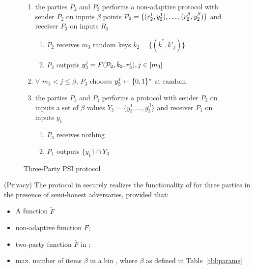 \begin{figure}[h]
{\begin{minipage}{0.95\linewidth}
\begin{enumerate}
				\item the parties $P_2$ and $P_3$ performs a non-adaptive \OPPRF protocol with sender $P_2$ on inputs $\beta$ points $\P_2=\{ (r^1_2, y^1_2), \ldots, (r^{\beta}_{2}, y^{\beta}_{2}) \}$ and receiver $P_3$ on inputs  $R_3$
				\begin{enumerate} 
					\item $P_2$ receives $m_3$  random keys $\bar{k}_2=\{(\bar{k}^*,\bar{k}'_{j})\}$  
					\item $P_3$  outputs $y^j_3=F( \P_2,\bar{k}_2, r^j_3), j \in [m_3]$	
				\end{enumerate}
			\item $\forall$ $ m_3 < j \leq \beta$, $P_3$ chooses ${y}^j_3 \from \bool^*$ at random.
				\item the parties $P_3$ and $P_1$ performs a \PSI protocol with sender $P_3$ on inputs a set of $\beta$ values $Y_3=\{ y^1_3, \ldots, y^{\beta}_{3} \}$ and receiver $P_1$ on inputs  $y_1$
				\begin{enumerate} 
					\item $P_3$ receives nothing
					\item $P_1$ outputs $\{y_1\} \cap Y_3$	
			\end{enumerate}		
	\end{enumerate}		
		\end{minipage}
	}
\caption{Three-Party PSI protocol}
\label{fig:3psi}
\end{figure}


\begin{theorem}(Privacy)
	\label{thm:sotpriv}
	The \OPPRF protocol in  securely realizes the  functionality of  for three parties in the presence of semi-honest adversaries, provided that:
	\begin{itemize}\addtolength{\itemsep}{-6pt}
			\item  A \batchOPRF function $\widetilde F$ 
		\item   non-adaptive \OPPRF function $F$;	
		\item   two-party \PSI function $\bar F$ in ;	
		\item max. number of items $\beta$ in a bin , where $\beta$ as defined in Table~\ref{tbl:params}
	\end{itemize}
\end{theorem}


